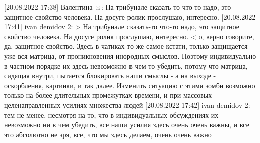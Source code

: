 [20.08.2022 17:38] Валентина ☼: На трибунале сказать-то что-то надо, это защитное свойство человека. На досуге ролик прослушаю, интересно.
[20.08.2022 17:41] ivan demidov 2: 
> На трибунале сказать-то что-то надо, это защитное свойство человека. На досуге ролик прослушаю, интересно. <
о, верно говорите, да, защитное свойство. Здесь в чатиках то же самое кстати, только защищается уже вся матрица, от проникновения инородных смыслов. Поэтому индивидуально в частном порядке их здесь невозможно в чем то убедить, потому что матрица, сидящая внутри, пытается блокировать наши смыслы - а на выходе - оскорбления, картинки, и так далее. Изменить ситуацию с этими зомби возможно только на более длительных промежутках времени, и при массовых целенаправленных усилиях множества людей
[20.08.2022 17:42] ivan demidov 2: тем не менее, несмотря на то, что в индивидуальных обсуждениях их невозможно ни в чем убедить, все наши усилия здесь очень очень важны, и все это абсолютно не зря, все, что мы здесь делаем, очень очень важно

